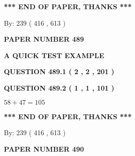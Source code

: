 \documentclass[12pt]{article}
\begin{document}
   
   
   
   
\vspace{1.0in} 
{\textbf{\large{ *** END OF PAPER, THANKS *** }}} 
   
   
\hspace{1.0in} By: 
 239 ( 416 ,  613 )
   
   
   
   
\newpage 
\setcounter{page}{ 
   489001 } 
   
   
   
   
 {\textbf{ \Large{ PAPER NUMBER  489  }}}
   
   
\vspace{0.2in}
   
   
   
   
   
   
 \vspace{0.2in}
{\LARGE {\textbf{ A QUICK TEST EXAMPLE}}}
   
   
  
\vspace{0.2in}
  
{\textbf{\Large{QUESTION
489.1 
 ( 2 , 2 , 201 )
}}}
  
  
  
\vspace{0.2in}
  
{\textbf{\Large{QUESTION
489.2 
 ( 1 , 1 , 101 )
}}}
  
  
 
 

$ %
58 +  %
47=   %
105$
 
 
   
   
 \vspace{0.2in}
 
   
   
   
   
\vspace{1.0in} 
{\textbf{\large{ *** END OF PAPER, THANKS *** }}} 
   
   
\hspace{1.0in} By: 
 239 ( 416 ,  613 )
   
   
   
   
\newpage 
\setcounter{page}{ 
   490001 } 
   
   
   
   
 {\textbf{ \Large{ PAPER NUMBER  490  }}}
   
\end{document}
